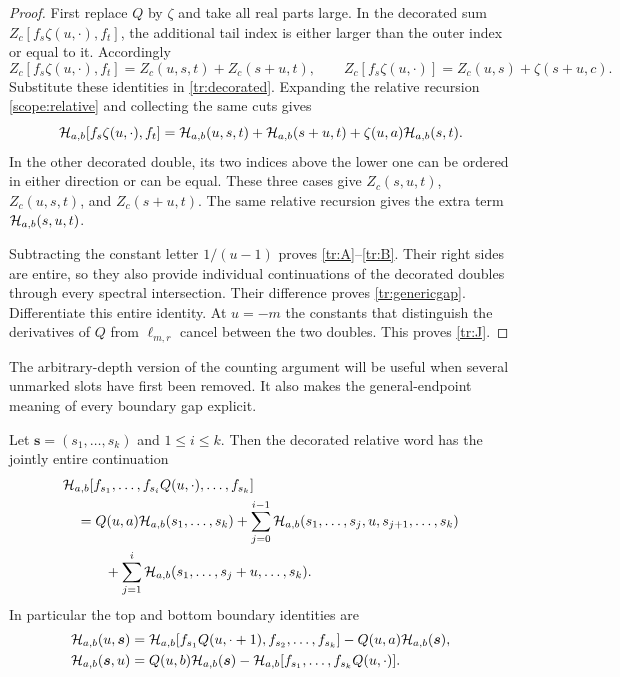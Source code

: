 \begin{proof}
First replace $Q$ by $\zeta$ and take all real parts large.
In the decorated sum $Z_c[f_s\zeta(u,\cdot),f_t]$, the additional
tail index is either larger than the outer index or equal to it.
Accordingly
\[
 Z_c[f_s\zeta(u,\cdot),f_t]
          =Z_c(u,s,t)+Z_c(s+u,t),
 \qquad
 Z_c[f_s\zeta(u,\cdot)]=Z_c(u,s)+\zeta(s+u,c).
\]
Substitute these identities in \eqref{tr:decorated}. Expanding the
relative recursion \eqref{scope:relative} and collecting the same cuts
gives
\[
 \mathcal H_{a,b}[f_s\zeta(u,\cdot),f_t]
   =\mathcal H_{a,b}(u,s,t)+\mathcal H_{a,b}(s+u,t)
                            +\zeta(u,a)\mathcal H_{a,b}(s,t).
\]
In the other decorated double, its two indices above the lower one
can be ordered in either direction or can be equal. These three cases
give $Z_c(s,u,t)$, $Z_c(u,s,t)$, and $Z_c(s+u,t)$.
The same relative recursion gives the extra term $\mathcal H_{a,b}(s,u,t)$.

Subtracting the constant letter $1/(u-1)$ proves
\eqref{tr:A}--\eqref{tr:B}. Their right sides are entire, so they also
provide individual continuations of the decorated doubles through every
spectral intersection. Their difference proves \eqref{tr:genericgap}.
Differentiate this entire identity. At $u=-m$ the constants that
distinguish the derivatives of $Q$ from $\ell_{m,r}$ cancel between
the two doubles. This proves \eqref{tr:J}.
\end{proof}

The arbitrary-depth version of the counting argument will be useful
when several unmarked slots have first been removed. It also makes the
general-endpoint meaning of every boundary gap explicit.

\begin{lemma}
\label{tr:masterlemma}
Let $\boldsymbol s=(s_1,\ldots,s_k)$ and $1\leq i\leq k$.
Then the decorated relative word has the jointly entire continuation
\begin{align}
 &\mathcal H_{a,b}[f_{s_1},\ldots,f_{s_i}Q(u,\cdot),\ldots,f_{s_k}]
 \notag\\
 &\quad=Q(u,a)\mathcal H_{a,b}(s_1,\ldots,s_k)
   +\sum_{j=0}^{i-1}\mathcal H_{a,b}(s_1,\ldots,s_j,u,s_{j+1},\ldots,s_k)
 \notag\\
 &\qquad\quad
   +\sum_{j=1}^{i}\mathcal H_{a,b}(s_1,\ldots,s_j+u,\ldots,s_k).
 \label{tr:masterdecorate}
\end{align}
In particular the top and bottom boundary identities are
\begin{align}
 \mathcal H_{a,b}(u,\boldsymbol s)
  &=\mathcal H_{a,b}[f_{s_1}Q(u,\cdot+1),f_{s_2},\ldots,f_{s_k}]
                      -Q(u,a)\mathcal H_{a,b}(\boldsymbol s),
 \label{tr:topgap}\\
 \mathcal H_{a,b}(\boldsymbol s,u)
  &=Q(u,b)\mathcal H_{a,b}(\boldsymbol s)
      -\mathcal H_{a,b}[f_{s_1},\ldots,f_{s_k}Q(u,\cdot)].
 \label{tr:bottomgap}
\end{align}
\end{lemma}

